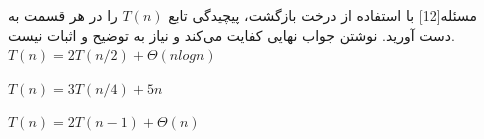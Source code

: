 ‌مسئله[12]
با استفاده از درخت بازگشت، پیچیدگی تابع $T(n)$ را در هر قسمت به دست آورید. نوشتن جواب نهایی کفایت می‌کند و نیاز به توضیح و اثبات نیست.
$T(n) = 2T(n/2) + \Theta(nlogn)$

$T(n) =3T(n/4) + 5n$

$T(n) = 2T(n-1) + \Theta(n)$












